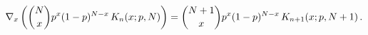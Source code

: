 \[\nabla_{x}\left(\binom{N}{x}p^{x}(1-p)^{N-x}\mathop{K_{n}\/}\nolimits\!\left(x%
;p,N\right)\right)=\binom{N+1}{x}p^{x}{(1-p)^{N-x}}\mathop{K_{n+1}\/}\nolimits%
\!\left(x;p,N+1\right).\]